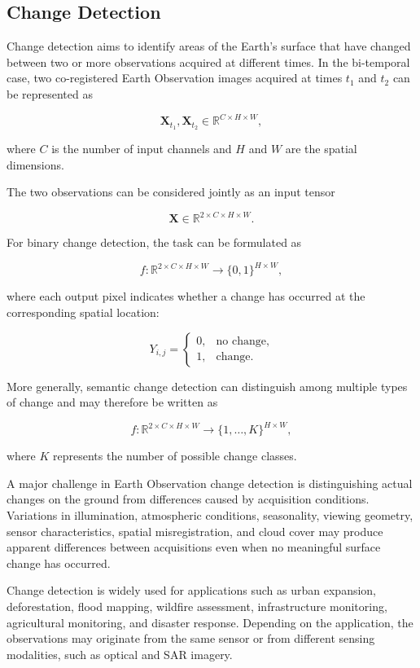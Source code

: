 \documentclass[11pt,a4paper]{article}
\begin{document}
\subsection{Change Detection}

Change detection aims to identify areas of the Earth's surface that have
changed between two or more observations acquired at different times.
In the bi-temporal case, two co-registered Earth Observation images
acquired at times \(t_1\) and \(t_2\) can be represented as

\[
\mathbf{X}_{t_1},\mathbf{X}_{t_2}
\in
\mathbb{R}^{C\times H\times W},
\]

where \(C\) is the number of input channels and \(H\) and \(W\) are the
spatial dimensions.

The two observations can be considered jointly as an input tensor

\[
\mathbf{X}
\in
\mathbb{R}^{2\times C\times H\times W}.
\]

For binary change detection, the task can be formulated as

\[
f:
\mathbb{R}^{2\times C\times H\times W}
\rightarrow
\{0,1\}^{H\times W},
\]

where each output pixel indicates whether a change has occurred at the
corresponding spatial location:

\[
Y_{i,j}=
\begin{cases}
0, & \text{no change},\\
1, & \text{change}.
\end{cases}
\]

More generally, semantic change detection can distinguish among multiple
types of change and may therefore be written as

\[
f:
\mathbb{R}^{2\times C\times H\times W}
\rightarrow
\{1,\ldots,K\}^{H\times W},
\]

where \(K\) represents the number of possible change classes.

A major challenge in Earth Observation change detection is distinguishing
actual changes on the ground from differences caused by acquisition
conditions. Variations in illumination, atmospheric conditions,
seasonality, viewing geometry, sensor characteristics, spatial
misregistration, and cloud cover may produce apparent differences
between acquisitions even when no meaningful surface change has occurred.

Change detection is widely used for applications such as urban
expansion, deforestation, flood mapping, wildfire assessment,
infrastructure monitoring, agricultural monitoring, and disaster
response. Depending on the application, the observations may originate
from the same sensor or from different sensing modalities, such as
optical and SAR imagery.
\end{document}
